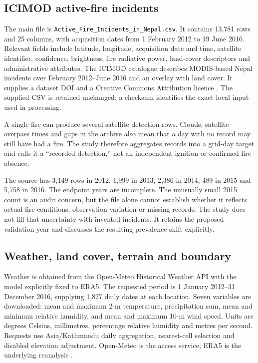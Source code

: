 \documentclass[conference,a4paper]{IEEEtran}
\begin{document}
\subsection{ICIMOD active-fire incidents}
The main file is \texttt{Active\_Fire\_Incidents\_in\_Nepal.csv}. It contains 13,781 rows and 25 columns, with acquisition dates from 1 February 2012 to 19 June 2016. Relevant fields include latitude, longitude, acquisition date and time, satellite identifier, confidence, brightness, fire radiative power, land-cover descriptors and administrative attributes. The ICIMOD catalogue describes MODIS-based Nepal incidents over February 2012--June 2016 and an overlay with land cover. It supplies a dataset DOI and a Creative Commons Attribution licence \citep{icimodfire}. The supplied CSV is retained unchanged; a checksum identifies the exact local input used in processing.

A single fire can produce several satellite detection rows. Clouds, satellite overpass times and gaps in the archive also mean that a day with no record may still have had a fire. The study therefore aggregates records into a grid-day target and calls it a ``recorded detection,'' not an independent ignition or confirmed fire absence.

The source has 3,149 rows in 2012, 1,999 in 2013, 2,386 in 2014, 489 in 2015 and 5,758 in 2016. The endpoint years are incomplete. The unusually small 2015 count is an audit concern, but the file alone cannot establish whether it reflects actual fire conditions, observation variation or missing records. The study does not fill that uncertainty with invented incidents. It retains the proposed validation year and discusses the resulting prevalence shift explicitly.

\subsection{Weather, land cover, terrain and boundary}
Weather is obtained from the Open-Meteo Historical Weather API with the model explicitly fixed to ERA5. The requested period is 1 January 2012--31 December 2016, supplying 1,827 daily dates at each location. Seven variables are downloaded: mean and maximum 2-m temperature, precipitation sum, mean and minimum relative humidity, and mean and maximum 10-m wind speed. Units are degrees Celsius, millimetres, percentage relative humidity and metres per second. Requests use Asia/Kathmandu daily aggregation, nearest-cell selection and disabled elevation adjustment. Open-Meteo is the access service; ERA5 is the underlying reanalysis \citep{openmeteo,hersbach}.
\end{document}
